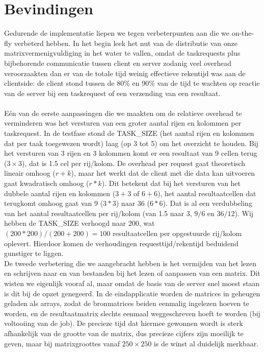 \documentclass[11pt]{article}
\begin{document}
\section{Bevindingen}
Gedurende de implementatie liepen we tegen verbeterpunten aan die we on-the-fly verbeterd hebben.
In het begin leek het nut van de distributie van onze matrixvermenigvuldiging in het water te
vallen, omdat de taskrequests plus bijbehorende communicatie tussen client en server zodanig
veel overhead veroorzaakten dan er van de totale tijd weinig effectieve rekentijd was aan de
clientside: de client stond tussen de 80\% en 90\% van de tijd te wachten op reactie van de
server bij een taskrequest of een verzending van een resultaat.\\
\\
E\'{e}n van de eerste aanpassingen die we maakten om de relatieve overhead te verminderen was
het versturen van een groter aantal rijen en kolommen per taskrequest. In de testfase stond de
TASK\_SIZE (het aantal rijen en kolommen dat per taak toegewezen wordt) laag (op 3 tot 5) om het
overzicht te houden. Bij het versturen van 3 rijen en 3 kolommen komt er een resultaat van 9 cellen
terug ($3\times3$), dat is 1.5 cel per rij/kolom. De overhead per request gaat theoretisch lineair omhoog
($r + k$), maar het werkt dat de client met die data kan uitvoeren gaat kwadratisch omhoog ($r * k$).
Dit betekent dat bij het versturen van het dubbele aantal rijen en kolommen ($3 + 3$ of $6 + 6$), het
aantal resultaatcellen dat terugkomt omhoog gaat van 9 ($3 * 3$) naar 36 ($6 * 6$). Dat is al een
verdubbeling van het aantal resultaatcellen per rij/kolom (van 1.5 naar 3, $9/6$ en $36/12$). Wij
hebben de TASK\_SIZE verhoogd naar 200, wat $(200*200)/(200+200) = 100$ resultaatcellen per
opgestuurde rij/kolom oplevert. Hierdoor komen de verhoudingen requesttijd/rekentijd beduidend
gunstiger te liggen.\\
De tweede verbetering die we aangebracht hebben is het vermijden van het lezen en schrijven
naar en van bestanden bij het lezen of aanpassen van een matrix. Dit wisten we eigenlijk vooraf
al, maar omdat de basis van de server snel moest staan is dit bij de opzet genegeerd. In de
eindapplicatie worden de matrices in geheugen geladen als arrays, zodat de bronmatrices beiden
eenmalig ingelezen hoeven te worden, en de resultaatmatrix slechts eenmaal weggeschreven hoeft
te worden (bij voltooiing van de job). De precieze tijd dat hiermee gewonnen wordt is sterk
afhankelijk van de grootte van de matrix, dus precieze cijfers zijn moeilijk te geven, maar bij
matrixgroottes vanaf $250\times250$ is de winst al duidelijk merkbaar.
\end{document}

